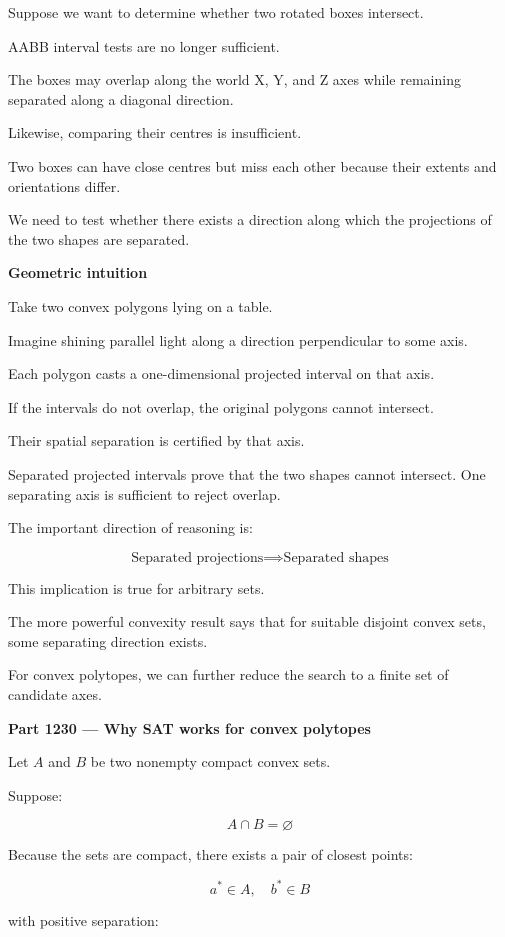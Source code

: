 Suppose we want to determine whether two rotated boxes intersect.

AABB interval tests are no longer sufficient.

The boxes may overlap along the world X, Y, and Z axes while remaining separated along a diagonal direction.

Likewise, comparing their centres is insufficient.

Two boxes can have close centres but miss each other because their extents and orientations differ.

We need to test whether there exists a direction along which the projections of the two shapes are separated.

\textbf{Geometric intuition}

Take two convex polygons lying on a table.

Imagine shining parallel light along a direction perpendicular to some axis.

Each polygon casts a one-dimensional projected interval on that axis.

If the intervals do not overlap, the original polygons cannot intersect.

Their spatial separation is certified by that axis.

Separated projected intervals prove that the two shapes cannot intersect. One separating axis is sufficient to reject overlap.

The important direction of reasoning is:

\[
\boxed{ \text{Separated projections} \implies \text{Separated shapes} }
\]

This implication is true for arbitrary sets.

The more powerful convexity result says that for suitable disjoint convex sets, some separating direction exists.

For convex polytopes, we can further reduce the search to a finite set of candidate axes.

\textbf{Part 1230 --- Why SAT works for convex polytopes}

Let \(A\) and \(B\) be two nonempty compact convex sets.

Suppose:

\[
A\cap B=\varnothing
\]

Because the sets are compact, there exists a pair of closest points:

\[
a^*\in A,\quad b^*\in B
\]

with positive separation:

